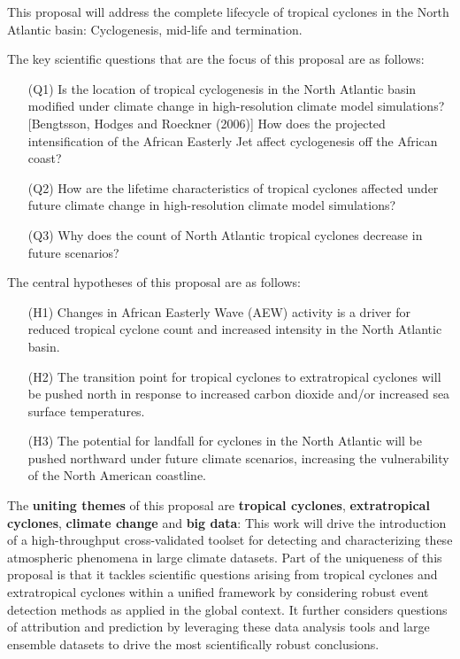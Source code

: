 \documentclass[11pt]{article}
\begin{document}
This proposal will address the complete lifecycle of tropical cyclones in the North Atlantic basin:  Cyclogenesis, mid-life and termination.

The key scientific questions that are the focus of this proposal are as follows:
\begin{itemize}
\item[(Q1)] Is the location of tropical cyclogenesis in the North Atlantic basin modified under climate change in high-resolution climate model simulations?  {\color{red}[Bengtsson, Hodges and Roeckner (2006)]}  How does the projected intensification of the African Easterly Jet affect cyclogenesis off the African coast?

\item[(Q2)] How are the lifetime characteristics of tropical cyclones affected under future climate change in high-resolution climate model simulations?

\item[(Q3)] Why does the count of North Atlantic tropical cyclones decrease in future scenarios?
\end{itemize}

The central hypotheses of this proposal are as follows:

\vspace{-0.4cm}
\begin{itemize}
\item[(H1)] Changes in African Easterly Wave (AEW) activity is a driver for reduced tropical cyclone count and increased intensity in the North Atlantic basin.

\item[(H2)] The transition point for tropical cyclones to extratropical cyclones will be pushed north in response to increased carbon dioxide and/or increased sea surface temperatures.

\item[(H3)] The potential for landfall for cyclones in the North Atlantic will be pushed northward under future climate scenarios, increasing the vulnerability of the North American coastline.
\end{itemize}

The \textbf{uniting themes} of this proposal are \textbf{tropical cyclones}, \textbf{extratropical cyclones}, \textbf{climate change} and \textbf{big data}: This work will drive the introduction of a high-throughput cross-validated toolset for detecting and characterizing these atmospheric phenomena in large climate datasets.  Part of the uniqueness of this proposal is that it tackles scientific questions arising from tropical cyclones and extratropical cyclones within a unified framework by considering robust event detection methods as applied in the global context.  It further considers questions of attribution and prediction by leveraging these data analysis tools and large ensemble datasets to drive the most scientifically robust conclusions.
\end{document}
